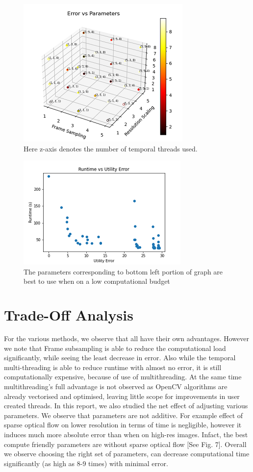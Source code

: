 \documentclass[conference]{IEEEtran}
\begin{document}
\begin{figure}[htbp]
\centerline{\includegraphics{plots/Error_vs_Params.png}}
\caption{Here z-axis denotes the number of temporal threads used.}
\label{ca_evp} 
\end{figure}
    
\begin{figure}[htbp]
\centerline{\includegraphics{plots/CompleteAnalysis_rVe.png}}
\caption{The parameters corresponding to bottom left portion of graph are best to use when on a low computational budget}
\label{ca_rve} 
\end{figure}
    
\section{Trade-Off Analysis}

For the various methods, we observe that all have their own advantages. However we note that Frame subsampling is able to reduce the computational load significantly, while seeing the least decrease in error.
Also while the temporal multi-threading is able to reduce runtime with almost no error, it is still computationally expensive, because of use of multithreading. At the same time multithreading's full advantage is not 
observed as OpenCV algorithms are already vectorised and optimised, leaving little scope for improvements in user created threads.
In this report, we also studied the net effect of adjusting various parameters. We observe that parameters are not additive. For example effect of sparse optical flow on lower resolution in terms of time is negligible, however it induces much more absolute error than when on high-res images.
Infact, the best compute friendly parameters are without sparse optical flow [See Fig. 7].
Overall we observe choosing the right set of parameters, can decrease computational time significantly (as high as 8-9 times) with minimal error.
\end{document}
